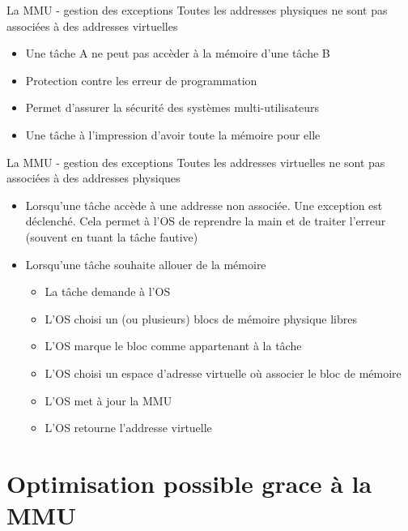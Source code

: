 \begin{frame}{La MMU - gestion des exceptions}
  Toutes les addresses physiques ne sont pas associées à des addresses
  virtuelles
  \begin{itemize} 
  \item Une tâche A ne peut pas accèder à la mémoire d'une tâche B
  \item Protection contre les erreur de programmation
  \item Permet d'assurer la sécurité des systèmes multi-utilisateurs
  \item Une tâche à l'impression d'avoir toute la mémoire pour elle
  \end{itemize} 
\end{frame} 

\begin{frame}{La MMU - gestion des exceptions}
  Toutes les addresses  virtuelles ne sont pas associées  à des addresses
  physiques
  \begin{itemize}
  \item  Lorsqu'une  tâche accède  à  une  addresse  non associée.   Une
    exception est déclenché.  Cela permet  à l'OS de reprendre la main
    et de traiter l'erreur (souvent en tuant la tâche fautive)
  \item Lorsqu'une tâche souhaite allouer de la mémoire
    \begin{itemize}
    \item  La tâche demande à l'OS
    \item  L'OS choisi  un (ou  plusieurs) blocs  de  mémoire physique
      libres
    \item L'OS marque le bloc comme appartenant à la tâche
    \item  L'OS choisi un  espace d'adresse  virtuelle où  associer le
      bloc de mémoire
    \item L'OS met à jour la MMU
    \item L'OS retourne l'addresse virtuelle
    \end{itemize} 
  \end{itemize} 
\end{frame} 

\section{Optimisation possible grace à la MMU}


